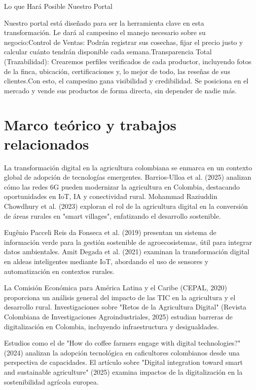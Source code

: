 Lo que Hará Posible Nuestro Portal

Nuestro portal está diseñado para ser la herramienta clave en esta transformación. Le dará al campesino el manejo necesario sobre su negocio:Control de Ventas: Podrán registrar sus cosechas, fijar el precio justo y calcular cuánto tendrán disponible cada semana.Transparencia Total (Trazabilidad): Crearemos perfiles verificados de cada productor, incluyendo fotos de la finca, ubicación, certificaciones y, lo mejor de todo, las reseñas de sus clientes.Con esto, el campesino gana visibilidad y credibilidad. Se posiciona en el mercado y vende sus productos de forma directa, sin depender de nadie más.

\section{Marco teórico y trabajos relacionados}

La transformación digital en la agricultura colombiana se enmarca en un contexto global de adopción de tecnologías emergentes. Barrios-Ulloa et al. (2025) analizan cómo las redes 6G pueden modernizar la agricultura en Colombia, destacando oportunidades en IoT, IA y conectividad rural. Mohammad Raziuddin Chowdhury et al. (2023) exploran el rol de la agricultura digital en la conversión de áreas rurales en "smart villages", enfatizando el desarrollo sostenible.

Eugênio Pacceli Reis da Fonseca et al. (2019) presentan un sistema de información verde para la gestión sostenible de agroecosistemas, útil para integrar datos ambientales. Amit Degada et al. (2021) examinan la transformación digital en aldeas inteligentes mediante IoT, abordando el uso de sensores y automatización en contextos rurales.

La Comisión Económica para América Latina y el Caribe (CEPAL, 2020) proporciona un análisis general del impacto de las TIC en la agricultura y el desarrollo rural. Investigaciones sobre "Retos de la Agricultura Digital" (Revista Colombiana de Investigaciones Agroindustriales, 2025) estudian barreras de digitalización en Colombia, incluyendo infraestructura y desigualdades.

Estudios como el de "How do coffee farmers engage with digital technologies?" (2024) analizan la adopción tecnológica en caficultores colombianos desde una perspectiva de capacidades. El artículo sobre "Digital integration toward smart and sustainable agriculture" (2025) examina impactos de la digitalización en la sostenibilidad agrícola europea.

